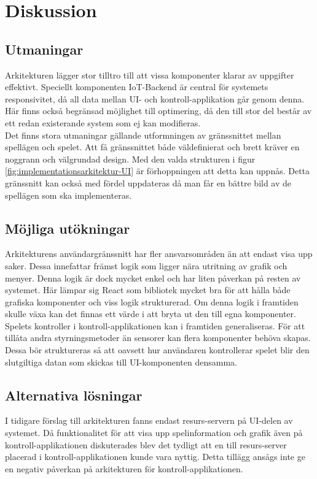 \section{Diskussion}
\subsection{Utmaningar}
Arkitekturen lägger stor tilltro till att vissa komponenter klarar av uppgifter effektivt. Speciellt komponenten IoT-Backend är central för systemets responsivitet, då all data mellan UI- och kontroll-applikation går genom denna. Här finns också begränsad möjlighet till optimering, då den till stor del består av ett redan existerande system som ej kan modifieras.\\

Det finns stora utmaningar gällande utformningen av gränssnittet mellan spellägen och spelet. Att få gränssnittet både väldefinierat och brett kräver en noggrann och välgrundad design. Med den valda strukturen i figur \ref{fig:implementationsarkitektur-UI} är förhoppningen att detta kan uppnås. Detta gränssnitt kan också med fördel uppdateras då man får en bättre bild av de spellägen som ska implementeras.\\

\subsection{Möjliga utökningar}
Arkitekturens användargränssnitt har fler ansvarsområden än att endast visa upp saker. Dessa innefattar främst logik som ligger nära utritning av grafik och menyer. Denna logik är dock mycket enkel och har liten påverkan på resten av systemet. Här lämpar sig React som bibliotek mycket bra för att hålla både grafiska komponenter och viss logik strukturerad. Om denna logik i framtiden skulle växa kan det finnas ett värde i att bryta ut den till egna komponenter.\\

Spelets kontroller i kontroll-applikationen kan i framtiden generaliseras. För att tillåta andra styrningsmetoder än sensorer kan flera komponenter behöva skapas. Dessa bör struktureras så att oavsett hur användaren kontrollerar spelet blir den slutgiltiga datan som skickas till UI-komponenten densamma.\\

\subsection{Alternativa lösningar}
I tidigare förslag till arkitekturen fanns endast resurs-servern på UI-delen av systemet. Då funktionalitet för att visa upp spelinformation och grafik även på kontroll-applikationen diskuterades blev det tydligt att en till resurs-server placerad i kontroll-applikationen kunde vara nyttig. Detta tillägg ansågs inte ge en negativ påverkan på arkitekturen för kontroll-applikationen.\\

